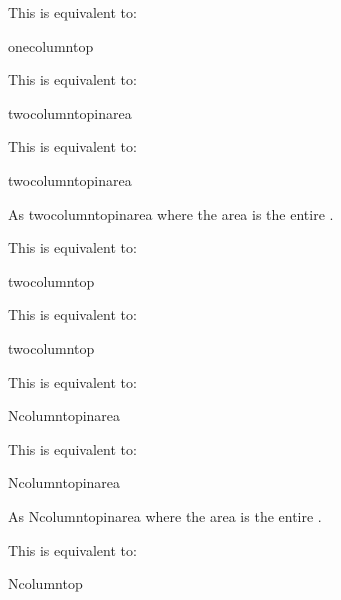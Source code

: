 \documentclass[fontsize=12pt]{scrbook}
\begin{document}
This is equivalent to: 
\begin{compactcodebox}
\gls{onecolumntop}
\end{compactcodebox}

This is equivalent to: 
\begin{compactcodebox}
\gls{twocolumntopinarea}
\end{compactcodebox}

This is equivalent to: 
\begin{compactcodebox}
\gls{twocolumntopinarea}
\end{compactcodebox}

As \gls{twocolumntopinarea} where the area is the entire
.

This is equivalent to: 
\begin{compactcodebox}
\gls{twocolumntop}
\end{compactcodebox}

This is equivalent to: 
\begin{compactcodebox}
\gls{twocolumntop}
\end{compactcodebox}

This is equivalent to: 
\begin{compactcodebox}
\gls{Ncolumntopinarea}
\end{compactcodebox}

This is equivalent to: 
\begin{compactcodebox}
\gls{Ncolumntopinarea}
\end{compactcodebox}

As \gls{Ncolumntopinarea} where the area is the entire .

This is equivalent to: 
\begin{compactcodebox}
\gls{Ncolumntop}
\end{compactcodebox}
\end{document}
